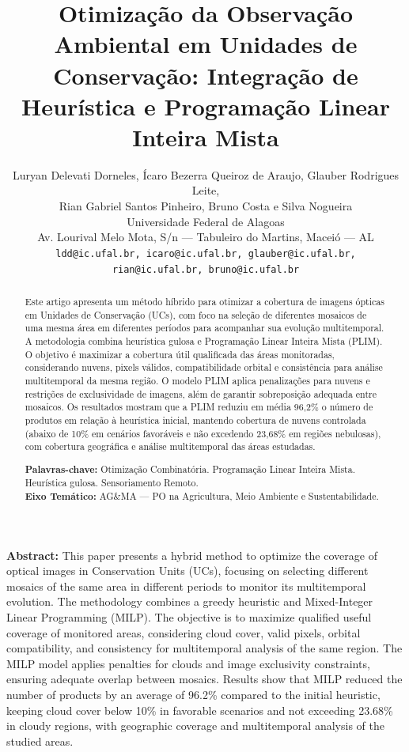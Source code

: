 \documentclass[a4paper,11pt]{article}
\title{\textbf{\Large Otimização da Observação Ambiental em Unidades de Conservação: Integração de Heurística e Programação Linear Inteira Mista}}%
\author{%
Luryan Delevati Dorneles, Ícaro Bezerra Queiroz de Araujo, Glauber Rodrigues Leite,\\
 Rian Gabriel Santos Pinheiro, Bruno Costa e Silva Nogueira\\[2mm]
Universidade Federal de Alagoas\\
Av. Lourival Melo Mota, S/n --- Tabuleiro do Martins, Maceió --- AL\\
\texttt{ldd@ic.ufal.br, icaro@ic.ufal.br, glauber@ic.ufal.br,}\\
\texttt{rian@ic.ufal.br, bruno@ic.ufal.br}
}
\date{}
\let\oldmaketitle\maketitle
\renewcommand{\maketitle}{%
  \oldmaketitle%
  \thispagestyle{fancy}
}
\begin{document}
\vspace{-5mm}
\maketitle
\vspace{-10mm}
\begin{abstract}
    Este artigo apresenta um método híbrido para otimizar a cobertura de imagens ópticas em Unidades de Conservação (UCs), com foco na seleção de diferentes mosaicos de uma mesma área em diferentes períodos para acompanhar sua evolução multitemporal. A metodologia combina heurística gulosa e Programação Linear Inteira Mista (PLIM). O objetivo é maximizar a cobertura útil qualificada das áreas monitoradas, considerando nuvens, pixels válidos, compatibilidade orbital e consistência para análise multitemporal da mesma região. O modelo PLIM aplica penalizações para nuvens e restrições de exclusividade de imagens, além de garantir sobreposição adequada entre mosaicos. Os resultados mostram que a PLIM reduziu em média 96,2\% o número de produtos em relação à heurística inicial, mantendo cobertura de nuvens controlada (abaixo de 10\% em cenários favoráveis e não excedendo 23,68\% em regiões nebulosas), com cobertura geográfica e análise multitemporal das áreas estudadas.

    \bigskip
    \noindent
    \textbf{Palavras-chave:} Otimização Combinatória. Programação Linear Inteira Mista. Heurística gulosa. Sensoriamento Remoto.\\
    \noindent\textbf{Eixo Temático:} AG\&MA --- PO na Agricultura, Meio Ambiente e Sustentabilidade.
    \end{abstract}
    
    \bigskip
\vspace{-8mm}
    
    \bigskip
    
\noindent\textbf{Abstract:} 
    This paper presents a hybrid method to optimize the coverage of optical images in Conservation Units (UCs), focusing on selecting different mosaics of the same area in different periods to monitor its multitemporal evolution. The methodology combines a greedy heuristic and Mixed-Integer Linear Programming (MILP). The objective is to maximize qualified useful coverage of monitored areas, considering cloud cover, valid pixels, orbital compatibility, and consistency for multitemporal analysis of the same region. The MILP model applies penalties for clouds and image exclusivity constraints, ensuring adequate overlap between mosaics. Results show that MILP reduced the number of products by an average of 96.2\% compared to the initial heuristic, keeping cloud cover below 10\% in favorable scenarios and not exceeding 23.68\% in cloudy regions, with geographic coverage and multitemporal analysis of the studied areas.
\end{document}
